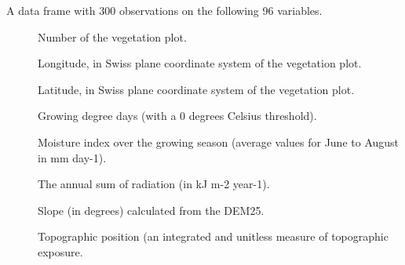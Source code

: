 \documentclass[a4paper]{book}
\begin{document}
\begin{Format}
A data frame with 300 observations on the following 96 variables.
\begin{description}

\item[] Number of the vegetation plot.
\item[] Longitude, in Swiss plane coordinate system of the vegetation plot.
\item[] Latitude, in Swiss plane coordinate system of the vegetation plot.
\item[] Growing degree days (with a 0 degrees Celsius threshold).
\item[] Moisture index over the growing season (average values for June to August in mm day-1).
\item[] The annual sum of radiation (in kJ m-2 year-1).
\item[] Slope (in degrees) calculated from the DEM25.
\item[] Topographic position (an integrated and unitless measure of topographic exposure.
\item[] 
\item[] 
\item[] 
\item[] 
\item[] 
\item[] 
\item[] 
\item[] 
\item[] 
\item[] 
\item[] 
\item[] 
\item[] 
\item[] 
\item[] 
\item[] 
\item[] 
\item[] 
\item[] 
\item[] 

\end{description}
\end{Format}
\end{document}
